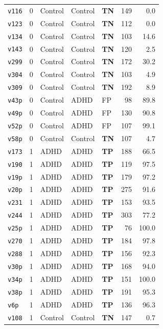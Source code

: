 \begin{longtable}{lclllrr}
  \texttt{v116} & 0 & Control & Control & \textbf{TN} & 149 & 0.0 \\
  \texttt{v123} & 0 & Control & Control & \textbf{TN} & 112 & 0.0 \\
  \texttt{v134} & 0 & Control & Control & \textbf{TN} & 103 & 14.6 \\
  \texttt{v143} & 0 & Control & Control & \textbf{TN} & 120 & 2.5 \\
  \texttt{v299} & 0 & Control & Control & \textbf{TN} & 172 & 30.2 \\
  \texttt{v304} & 0 & Control & Control & \textbf{TN} & 103 & 4.9 \\
  \texttt{v309} & 0 & Control & Control & \textbf{TN} & 192 & 8.9 \\
  \texttt{v43p} & 0 & Control & ADHD & FP & 98 & 89.8 \\
  \texttt{v49p} & 0 & Control & ADHD & FP & 130 & 90.8 \\
  \texttt{v52p} & 0 & Control & ADHD & FP & 107 & 99.1 \\
  \texttt{v58p} & 0 & Control & Control & \textbf{TN} & 107 & 4.7 \\
  \midrule
  \texttt{v173} & 1 & ADHD & ADHD & \textbf{TP} & 188 & 66.5 \\
  \texttt{v190} & 1 & ADHD & ADHD & \textbf{TP} & 119 & 97.5 \\
  \texttt{v19p} & 1 & ADHD & ADHD & \textbf{TP} & 179 & 97.2 \\
  \texttt{v20p} & 1 & ADHD & ADHD & \textbf{TP} & 275 & 91.6 \\
  \texttt{v231} & 1 & ADHD & ADHD & \textbf{TP} & 153 & 93.5 \\
  \texttt{v244} & 1 & ADHD & ADHD & \textbf{TP} & 303 & 77.2 \\
  \texttt{v25p} & 1 & ADHD & ADHD & \textbf{TP} & 76 & 100.0 \\
  \texttt{v270} & 1 & ADHD & ADHD & \textbf{TP} & 184 & 97.8 \\
  \texttt{v288} & 1 & ADHD & ADHD & \textbf{TP} & 156 & 92.3 \\
  \texttt{v30p} & 1 & ADHD & ADHD & \textbf{TP} & 168 & 94.0 \\
  \texttt{v34p} & 1 & ADHD & ADHD & \textbf{TP} & 151 & 100.0 \\
  \texttt{v38p} & 1 & ADHD & ADHD & \textbf{TP} & 191 & 95.3 \\
  \texttt{v6p} & 1 & ADHD & ADHD & \textbf{TP} & 136 & 96.3 \\
  \texttt{v108} & 1 & Control & Control & \textbf{TN} & 147 & 0.7 \\

\end{longtable}
